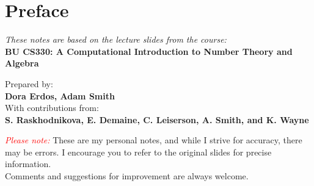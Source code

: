 \chapter*{Preface}

\begin{center}
    \vfill
    \textit{These notes are based on the lecture slides from the course:}\\
    \textbf{BU CS330: A Computational Introduction to Number Theory and Algebra}
    
    \vspace{1em}
    \small{
    Prepared by:\\
    \textbf{Dora Erdos, Adam Smith}\\
    With contributions from:\\
    \textbf{S. Raskhodnikova, E. Demaine, C. Leiserson, A. Smith, and K. Wayne}
    }

    \vspace{3em}
    \textcolor{red}{\textit{Please note:}} These are my personal notes, and while I strive for accuracy, there may be errors. I encourage you to refer to the original slides for precise information.\\
    Comments and suggestions for improvement are always welcome.
    \vfill
\end{center}
